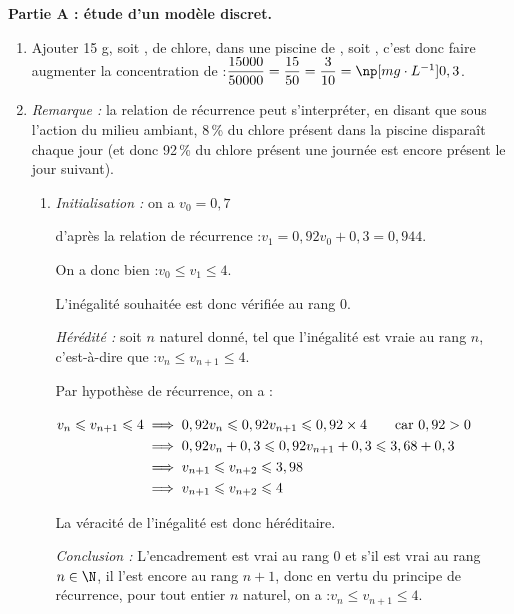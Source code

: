
\medskip

\textbf{Partie A : étude d'un modèle discret.}

\smallskip

\begin{enumerate}
	\item Ajouter 15 g, soit , de chlore, dans une piscine de , soit , c'est donc faire augmenter la concentration de :\quad$\dfrac{15000}{50000} =\dfrac{15}{50}= \dfrac{3}{10} = \np[mg\cdot L^{-1}]{0,3}$.

	\item \emph{Remarque :} la relation de récurrence peut s'interpréter, en disant que sous l'action du milieu ambiant, 8\,\% du chlore présent dans la piscine disparaît chaque jour (et donc 92\,\% du chlore présent une journée est encore présent le jour suivant).
	\begin{enumerate}
		\item \emph{Initialisation :} on a \quad $v_0 = 0,7$

		d'après la relation de récurrence :\quad $v_1 = 0,92v_0 + 0,3 = 0,944$.

		On a donc bien :\quad $v_0 \leqslant v_1 \leqslant 4$.

		L'inégalité souhaitée est donc vérifiée au rang 0.

		\smallskip

		\emph{Hérédité :} soit $n$ naturel donné, tel que l'inégalité est vraie au rang $n$, c'est-à-dire que :\quad $v_n \leqslant v_{n+1}\leqslant 4$.

Par hypothèse de récurrence, on a :

$\aligned[t] v_n \leqslant v_{n+1}\leqslant 4 &\implies 0,92 v_n \leqslant 0,92v_{n+1} \leqslant 0,92 \times 4\qquad\text{car } 0,92 >0\\
		&\implies 0,92 v_n + 0,3 \leqslant 0,92v_{n+1}+ 0,3 \leqslant 3,68 + 0,3 \\
		&\implies v_{n+1} \leqslant v_{n+2}  \leqslant 3,98 \\
		&\implies v_{n+1} \leqslant v_{n+2}  \leqslant 4\\
		\endaligned$

La véracité de l'inégalité est donc héréditaire.

\emph{Conclusion :} L'encadrement est vrai au rang 0 et s'il est vrai au rang $n \in \N$, il l'est encore au rang $n + 1$, donc en vertu du principe de récurrence, pour tout entier $n$ naturel, on a :\quad $v_n \leqslant v_{n+1} \leqslant 4$.


\end{enumerate}
\end{enumerate}
